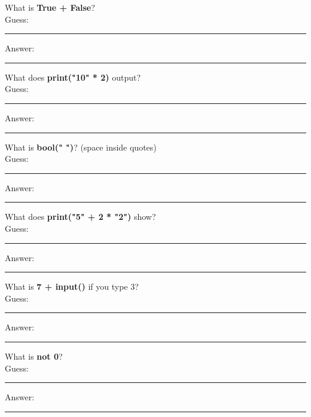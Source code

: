 \documentclass{article}
\begin{document}
\begin{tasks}[
    style=enumerate,
    label-format=\bfseries,
    label-width=1.5em,
    item-indent=2em,
    column-sep=1em,
    after-item-skip=2em
  ]
        \task What is \textbf{True + False}?  \\
        Guess:  \vspace{3mm}\\
        \rule{\linewidth}{0.4pt} %
        Answer:  \vspace{3mm}\\
        \rule{\linewidth}{0.4pt} %

        \task What does \textbf{print("10" * 2)} output?  \\
        Guess:  \vspace{3mm}\\
        \rule{\linewidth}{0.4pt} %
        Answer:  \vspace{3mm}\\
        \rule{\linewidth}{0.4pt} %

        \task What is \textbf{bool(" ")}? (space inside quotes)  \\
        Guess:  \vspace{3mm}\\
        \rule{\linewidth}{0.4pt} %
        Answer:  \vspace{3mm}\\
        \rule{\linewidth}{0.4pt} %

        \task What does \textbf{print("5" + 2 * "2")} show?  \\
        Guess:  \vspace{3mm}\\
        \rule{\linewidth}{0.4pt} %
        Answer:  \vspace{3mm}\\
        \rule{\linewidth}{0.4pt} %

        \task What is \textbf{7 + input()} if you type 3?  \\
        Guess:  \vspace{3mm}\\
        \rule{\linewidth}{0.4pt} %
        Answer:  \vspace{3mm}\\
        \rule{\linewidth}{0.4pt} %

        \task What is \textbf{not 0}?  \\
        Guess:  \vspace{3mm}\\
        \rule{\linewidth}{0.4pt} %
        Answer:  \vspace{3mm}\\
        \rule{\linewidth}{0.4pt} %


\end{tasks}
\end{document}
